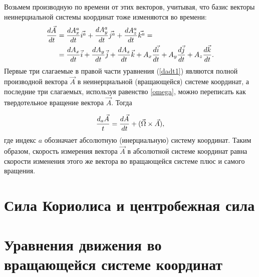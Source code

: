     Возьмем производную по времени от этих векторов, учитывая, что базис векторы неинерциальной системы координат тоже изменяются во времени:
    \begin{equation}
    \begin{aligned}
    \label{dadt1}
        \displaystyle\frac{d \vec{A}}{d t} &=\displaystyle\frac{d A_x^a}{d t}\vec{i^a} + \displaystyle\frac{d A_y^a}{d t}\vec{j^a} + \displaystyle\frac{d A_z^a}{d t}\vec{k^a} = \\ 
        &= 
            \displaystyle\frac{d A_x}{d t}\vec{i} 
            + \displaystyle\frac{d A_y}{d t}\vec{j} 
            + \displaystyle\frac{d A_z}{d t}\vec{k}
            + A_x\displaystyle\frac{d \vec{i}}{d t}  
            + A_y\displaystyle\frac{d \vec{j}}{d t}  
            + A_z\displaystyle\frac{d \vec{k}}{d t}. 
    \end{aligned}
    \end{equation}
    Первые три слагаемые в правой части уравнения (\ref{dadt1}) являются полной производной вектора $\vec{A}$ в неинерциальной (вращающейся) системе координат, а последние три слагаемых, используя равенство \ref{omega}, можно переписать как твердотельное вращение вектора $\vec{A}$. Тогда 

    \begin{equation}
    \label{dadt2}
        \frac{d_a\vec{A}}{t} = \displaystyle\frac{d \vec{A}}{d t} + (\vec{\Omega}\times\vec{A}),
    \end{equation}
    где индекс $a$ обозначает абсолютную (инерциальную) систему координат. Таким образом, скорость измерения вектора $\vec{A}$ в абсолютной системе координат равна скорости изменения этого же вектора во вращающейся системе плюс и самого вращения. 

\section{{\color{noone} Сила Кориолиса и центробежная сила}}
    \lipsum[1-2]


\section{{\color{noone} Уравнения движения во вращающейся системе координат}}
    


